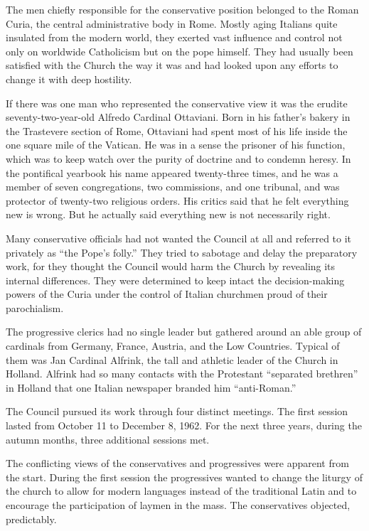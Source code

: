 The men chiefly responsible for the conservative position belonged to the Roman Curia, the central
administrative body in Rome. Mostly aging Italians quite insulated from the modern world, they
exerted vast influence and control not only on worldwide Catholicism but on the pope himself. They
had usually been satisfied with the Church the way it was and had looked upon any efforts to change
it with deep hostility.

If there was one man who represented the conservative view it was the erudite seventy-two-year-old
Alfredo Cardinal Ottaviani. Born in his father’s bakery in the Trastevere section of Rome, Ottaviani
had spent most of his life inside the one square mile of the Vatican. He was in a sense the prisoner
of his function, which was to keep watch over the purity of doctrine and to condemn heresy. In the
pontifical yearbook his name appeared twenty-three times, and he was a member of seven
congregations, two commissions, and one tribunal, and was protector of twenty-two religious orders.
His critics said that he felt everything new is wrong. But he actually said everything new is not
necessarily right.

Many conservative officials had not wanted the Council at all and referred to it privately as “the
Pope’s folly.” They tried to sabotage and delay the preparatory work, for they thought the Council
would harm the Church by revealing its internal differences. They were determined to keep intact the
decision-making powers of the Curia under the control of Italian churchmen proud of their
parochialism.

The progressive clerics had no single leader but gathered around an able group of cardinals from
Germany, France, Austria, and the Low Countries. Typical of them was Jan Cardinal Alfrink, the tall
and athletic leader of the Church in Holland. Alfrink had so many contacts with the Protestant
“separated brethren” in Holland that one Italian newspaper branded him “anti-Roman.”

The Council pursued its work through four distinct meetings. The first session lasted from October
11 to December 8, 1962. For the next three years, during the autumn months, three additional
sessions met.

The conflicting views of the conservatives and progressives were apparent from the start. During the
first session the progressives wanted to change the liturgy of the church to allow for modern
languages instead of the traditional Latin and to encourage the participation of laymen in the mass.
The conservatives objected, predictably.

